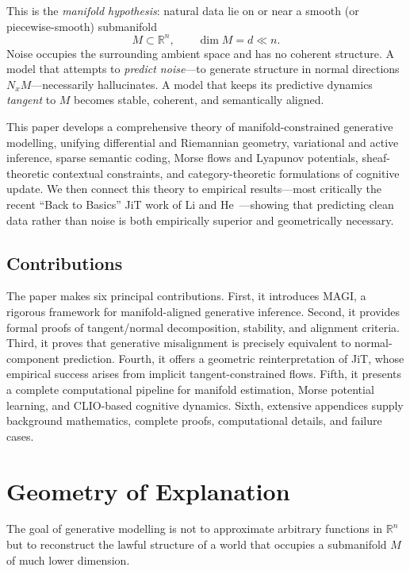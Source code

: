 \documentclass[11pt,a4paper,twocolumn]{article}
\begin{document}
This is the \emph{manifold hypothesis}: natural data lie on or near a
smooth (or piecewise-smooth) submanifold
\[
M \subset \mathbb{R}^n, \qquad \dim M = d \ll n.
\]
Noise occupies the surrounding ambient space and has no coherent
structure. A model that attempts to \emph{predict noise}---to generate
structure in normal directions $N_x M$---necessarily hallucinates. A
model that keeps its predictive dynamics \emph{tangent} to $M$ becomes
stable, coherent, and semantically aligned.

This paper develops a comprehensive theory of manifold-constrained
generative modelling, unifying differential and Riemannian geometry,
variational and active inference, sparse semantic coding, Morse flows
and Lyapunov potentials, sheaf-theoretic contextual constraints, and
category-theoretic formulations of cognitive update. We then connect
this theory to empirical results---most critically the recent ``Back to
Basics'' JiT work of Li and He~\cite{li2025backtobasics}---showing that
predicting clean data rather than noise is both empirically superior and
geometrically necessary.

\subsection{Contributions}

The paper makes six principal contributions. First, it introduces MAGI,
a rigorous framework for manifold-aligned generative inference. Second,
it provides formal proofs of tangent/normal decomposition, stability,
and alignment criteria. Third, it proves that generative misalignment
is precisely equivalent to normal-component prediction. Fourth, it
offers a geometric reinterpretation of JiT, whose empirical success
arises from implicit tangent-constrained flows. Fifth, it presents a
complete computational pipeline for manifold estimation, Morse potential
learning, and CLIO-based cognitive dynamics. Sixth, extensive appendices
supply background mathematics, complete proofs, computational details,
and failure cases.


\section{Geometry of Explanation}

The goal of generative modelling is not to approximate arbitrary
functions in $\mathbb{R}^n$ but to reconstruct the lawful structure of a
world that occupies a submanifold $M$ of much lower dimension.
\end{document}
